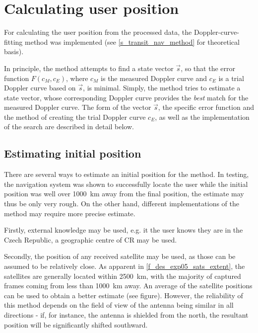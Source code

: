 \section{Calculating user position}
For calculating the user position from the processed data, the Doppler-curve-fitting method was implemented (see \autoref{s_transit_nav_method} for theoretical basis). %

In principle, the method attempts to find a state vector $\Vec{s}$, so that the error function $F(c_M, c_E)$, where $c_M$ is the measured Doppler curve and $c_E$ is a trial Doppler curve based on $\Vec{s}$, is minimal. Simply, the method tries to estimate a state vector, whose corresponding Doppler curve provides the \textit{best} match for the measured Doppler curve. The form of the vector $\Vec{s}$, the specific error function and the method of creating the trial Doppler curve $c_E$, as well as the implementation of the search are described in detail below.

\subsection{Estimating initial position}
There are several ways to estimate an initial position for the method. In testing, the navigation system was shown to successfully locate the user while the initial position was well over \qty{1000}{km} away from the final position, the estimate may thus be only very rough. On the other hand, different implementations of the method may require more precise estimate.

Firstly, external knowledge may be used, e.g. it the user knows they are in the Czech Republic, a geographic centre of CR may be used.

Secondly, the position of any received satellite may be used, as those can be assumed to be relatively close. As apparent in \autoref{f_des_exp05_sats_extent}, the satellites are generally located within \qty{2500}{km}, with the majority of captured frames coming from less than \qty{1000}{km} away. An average of the satellite positions can be used to obtain a better estimate (see figure). However, the reliability of this method depends on the field of view of the antenna being similar in all directions - if, for instance, the antenna is shielded from the north, the resultant position will be significantly shifted southward.

